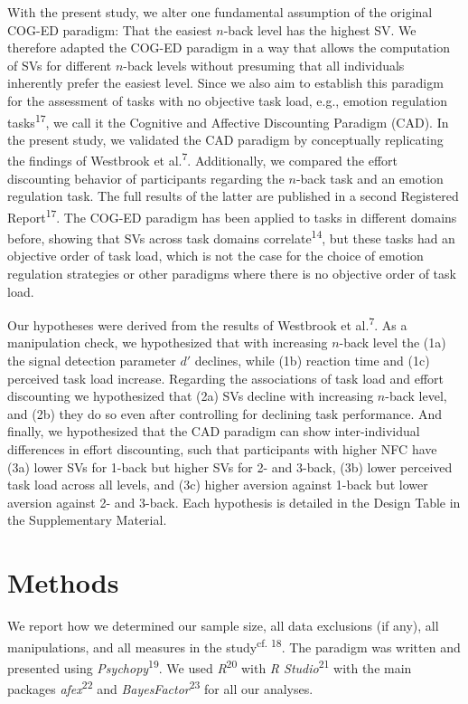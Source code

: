 \documentclass[
  man,floatsintext]{apa6}
\begin{document}
With the present study, we alter one fundamental assumption of the original COG-ED paradigm: That the easiest \(n\)-back level has the highest SV.
We therefore adapted the COG-ED paradigm in a way that allows the computation of SVs for different \(n\)-back levels without presuming that all individuals inherently prefer the easiest level.
Since we also aim to establish this paradigm for the assessment of tasks with no objective task load, e.g., emotion regulation tasks\textsuperscript{17}, we call it the Cognitive and Affective Discounting Paradigm (CAD).
In the present study, we validated the CAD paradigm by conceptually replicating the findings of Westbrook et al.\textsuperscript{7}.
Additionally, we compared the effort discounting behavior of participants regarding the \(n\)-back task and an emotion regulation task.
The full results of the latter are published in a second Registered Report\textsuperscript{17}.
The COG-ED paradigm has been applied to tasks in different domains before, showing that SVs across task domains correlate\textsuperscript{14}, but these tasks had an objective order of task load, which is not the case for the choice of emotion regulation strategies or other paradigms where there is no objective order of task load.

Our hypotheses were derived from the results of Westbrook et al.\textsuperscript{7}.
As a manipulation check, we hypothesized that with increasing \(n\)-back level the (1a) the signal detection parameter \(d'\) declines, while (1b) reaction time and (1c) perceived task load increase.
Regarding the associations of task load and effort discounting we hypothesized that (2a) SVs decline with increasing \(n\)-back level, and (2b) they do so even after controlling for declining task performance.
And finally, we hypothesized that the CAD paradigm can show inter-individual differences in effort discounting, such that participants with higher NFC have (3a) lower SVs for 1-back but higher SVs for 2- and 3-back, (3b) lower perceived task load across all levels, and (3c) higher aversion against 1-back but lower aversion against 2- and 3-back.
Each hypothesis is detailed in the Design Table in the Supplementary Material.

\hypertarget{methods}{%
\section{Methods}\label{methods}}

We report how we determined our sample size, all data exclusions (if any), all manipulations, and all measures in the study\textsuperscript{cf. 18}.
The paradigm was written and presented using \emph{Psychopy}\textsuperscript{19}.
We used \emph{R}\textsuperscript{20} with \emph{R Studio}\textsuperscript{21} with the main packages \emph{afex}\textsuperscript{22} and \emph{BayesFactor}\textsuperscript{23} for all our analyses.
\end{document}
